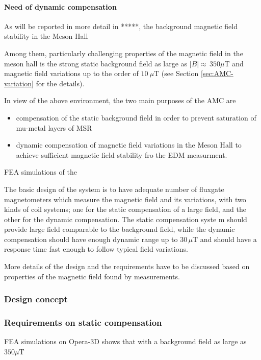 \paragraph*{Need of dynamic compensation }


As will be reported in more detail in *****, the background magnetic field stability in the Meson Hall 



Among them,  particularly challenging properties  of the magnetic field in the meson hall is the strong static background field as large as  $|B|\approx\,350\mu$T and magnetic field variations up to the  order of $10~\mu$T (see Section \ref{sec:AMC-variation} for the details).

In view of the above environment,  the two main purposes of the AMC  are
\begin{itemize}
\item compensation of the static background field in order to prevent saturation of mu-metal layers of MSR
\item dynamic compensation of magnetic field variations in the Meson Hall to achieve sufficient magnetic field stability fro the EDM measurment.
\end{itemize}
FEA simulations of the 

    
    The basic design of the system is to have adequate number of fluxgate magnetometers which measure the magnetic  field and its variations, with two kinds of coil systems; one for the  static compensation of a large field, and the other for the dynamic compensation. The static compensation syste m should provide large field comparable to the background field, while the dynamic compensation should have enough dynamic range up to $30\,\mu$T and should have a response time fast enough to follow typical field variations.
    
    More details of the design and the requirements have to be discussed based on properties of the magnetic field found by measurements. 

\subsubsection{Design concept}

\subsubsection{Requirements on static compensation}
FEA simulations on Opera-3D shows that with a background field as large as  $350\mu$T


